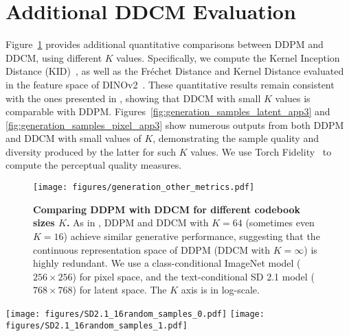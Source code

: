 
\section{Additional DDCM Evaluation}\label{app:more_random_gens}

Figure~\ref{fig:generation_other_metrics} provides additional quantitative comparisons between DDPM and DDCM, using different $K$ values.
Specifically, we compute the Kernel Inception Distance (KID)~\citep{bińkowski2018demystifying}, as well as the Fréchet Distance and Kernel Distance evaluated in the feature space of DINOv2~\citep{stein2023exposing,oquab2024dinov}.
These quantitative results remain consistent with the ones presented in , showing that DDCM with small $K$ values is comparable with DDPM.
Figures~\ref{fig:generation_samples_latent_app3} and \ref{fig:generation_samples_pixel_app3} show numerous outputs from both DDPM and DDCM with small values of $K$, demonstrating the sample quality and diversity produced by the latter for such $K$ values.
We use Torch Fidelity~\citep{obukhov2020torchfidelity} to compute the perceptual quality measures.
\begin{figure}[H]
    \centering
    \texttt{[image: figures/generation\_other\_metrics.pdf]}
    \caption{\textbf{Comparing DDPM with DDCM for different codebook sizes $K$.} 
    As in , DDPM and DDCM with $K=64$ (sometimes even $K=16$) achieve similar generative performance, suggesting that the continuous representation space of DDPM (DDCM with $K =\infty$) is highly redundant.
    We use a class-conditional ImageNet model ($256 \times 256$) for pixel space, and the text-conditional SD 2.1 model ($768 \times 768$) for latent space. The $K$ axis is in log-scale.
    }
    \label{fig:generation_other_metrics}
\end{figure}



\begin{figure*}[t]
    \centering
    \texttt{[image: figures/SD2.1\_16random\_samples\_0.pdf]}\vspace{0.2cm}
    \texttt{[image: figures/SD2.1\_16random\_samples\_1.pdf]}\vspace{0.2cm}
    \caption{\textbf{Qualitative comparison of sample quality and diversity between DDCM and DDPM.}
    We generate multiple samples for each prompt, using the $768\times768$ SD 2.1 model.}
    \label{fig:generation_samples_latent_app3}
\end{figure*}

